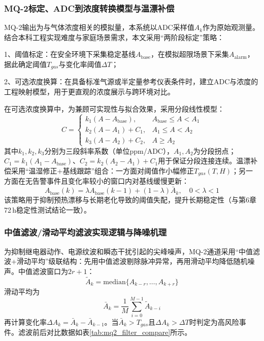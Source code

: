 \documentclass[UTF8,12pt,a4paper,oneside]{ctexbook}
\newcommand{\kuan}[1]{\par\noindent\hspace*{2em}\CJKfamily{song}\zihao{-4}#1、}
\numberwithin{equation}{chapter}
\begin{document}
\subsubsection*{MQ-2标定、ADC到浓度转换模型与温漂补偿}
MQ-2输出为与气体浓度相关的模拟量，本系统以ADC采样值$A_k$作为原始观测量。结合本科工程实现难度与家庭场景需求，本文采用“两阶段标定”策略：  
\kuan{1}阈值标定：在安全环境下采集稳定基线$A_{\mathrm{base}}$，在模拟超限场景下采集$A_{\mathrm{alarm}}$，据此确定阈值$T_{gas}$与变化率阈值$\Delta T$；  
\kuan{2}可选浓度换算：在具备标准气源或半定量参考仪表条件时，建立ADC与浓度的工程映射模型，用于更直观的浓度展示与跨环境对比。

在可选浓度换算中，为兼顾可实现性与拟合效果，采用分段线性模型：
\begin{equation}
C=
\begin{cases}
k_1(A-A_{\mathrm{base}}), & A_{\mathrm{base}}\le A<A_1\\
k_2(A-A_1)+C_1, & A_1\le A<A_2\\
k_3(A-A_2)+C_2, & A\ge A_2
\end{cases}
\label{eq:mq2_piecewise}
\end{equation}
其中$k_1,k_2,k_3$分别为三段斜率系数（单位ppm/ADC），$A_1,A_2$为分段拐点；$C_1=k_1(A_1-A_{\mathrm{base}})$、$C_2=k_2(A_2-A_1)+C_1$用于保证分段连接连续。温漂补偿采用“温湿修正+基线跟踪”组合：一方面对阈值作小幅修正$T_{gas}(T,H)$；另一方面在无告警事件且变化率较小的窗口内对基线缓慢更新：
\begin{equation}
A_{\mathrm{base}}(k)=\lambda A_{\mathrm{base}}(k-1)+(1-\lambda)\bar{A}_k,\quad 0<\lambda<1
\label{eq:mq2_baseline_track}
\end{equation}
该策略用于抑制预热漂移与长期老化导致的阈值失配，提升长期稳定性（与第6章72\,h稳定性测试结论一致）。

\subsubsection*{中值滤波/滑动平均滤波实现逻辑与降噪机理}
为抑制继电器动作、电源纹波和瞬态干扰引起的尖峰噪声，MQ-2通道采用“中值滤波+滑动平均”级联结构：先用中值滤波剔除脉冲异常，再用滑动平均降低随机噪声。中值滤波窗口为$2r+1$：
\begin{equation}
\tilde{A}_k=\mathrm{median}\{A_{k-r},\ldots,A_{k+r}\}
\label{eq:median_filter}
\end{equation}
滑动平均为
\begin{equation}
\bar{A}_k=\frac{1}{M}\sum_{i=0}^{M-1}\tilde{A}_{k-i}
\label{eq:mean_filter}
\end{equation}
再计算变化率$\Delta A_k=\bar{A}_k-\bar{A}_{k-1}$。当$\bar{A}_k>T_{gas}$且$\Delta A_k>\Delta T$时判定为高风险事件。滤波前后对比数据如表\ref{tab:mq2_filter_compare}所示。
\end{document}
